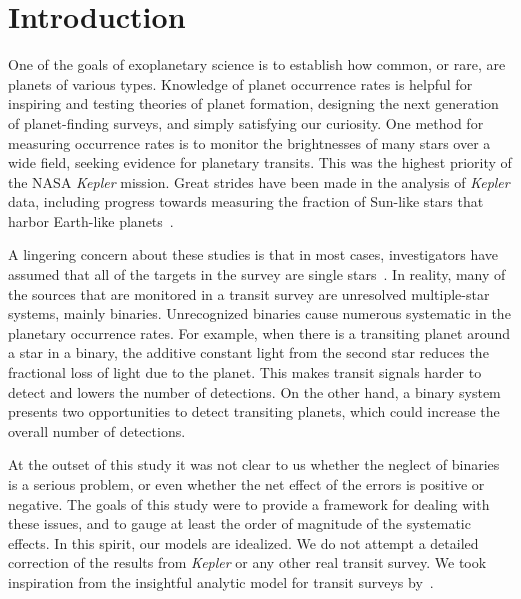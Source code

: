 \documentclass[12pt,modern,trackchanges]{aastex61}
\begin{document}

\section{Introduction}

One of the goals of exoplanetary science is to establish how common,
or rare, are planets of various types.  Knowledge of planet occurrence
rates is helpful for inspiring and testing theories of planet
formation, designing the next generation of planet-finding surveys,
and simply satisfying our curiosity.  One method for measuring
occurrence rates is to monitor the brightnesses of many stars over a
wide field, seeking evidence for planetary transits.  This was the
highest priority of the NASA {\it Kepler} mission.  Great strides have
been made in the analysis of {\it Kepler} data, including progress
towards measuring the fraction of Sun-like stars that harbor
Earth-like planets~\citep{
  youdin_exoplanet_2011,petigura_prevalence_2013,dong_fast_2013,
  foreman-mackey_exoplanet_2014,burke_terrestrial_2015}.

A lingering concern about these studies is that in most cases,
investigators have assumed that all of the targets in the survey
are single stars~\citep[\textit{e.g.},][]{
  howard_planet_2012,fressin_false_2013,
  dressing_occurrence_2015,burke_terrestrial_2015}. 
In reality, many of the sources that are monitored in a transit survey are
unresolved multiple-star systems, mainly binaries.  Unrecognized
binaries cause numerous systematic  in 
the planetary occurrence
rates.  For example, when there is a transiting planet around a star
in a binary, the additive constant light from the second star reduces
the fractional loss of light due to the planet.  This makes transit
signals harder to detect and lowers the number of detections.  On the
other hand, a binary system presents two opportunities to detect
transiting planets, which could increase the overall number of
detections.

At the outset of this study it was not clear to us whether the neglect
of binaries is a serious problem, or even whether the net effect of
the errors is positive or negative.  The goals of this study were to
provide a framework for dealing with these issues, and to gauge at
least the order of magnitude of the systematic effects.  In this
spirit, our models are idealized.  We do not attempt a detailed
correction of the results from {\it Kepler} or any other real transit
survey.  We took inspiration from the insightful analytic model for
transit surveys by~\citet{pepper_using_2003}.
\end{document}
